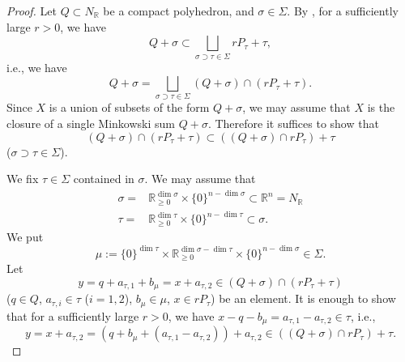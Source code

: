 \documentclass[10pt,a4paper]{amsart}
\def\R{\mathbb{R}}
\begin{document}
   \begin{proof}
     Let $Q \subset N_\R$ be a 
     compact polyhedron, 
        and  $\sigma \in \Sigma$.
    By , 
    for a sufficiently large $r >0$, 
     we have  
     $$ Q + \sigma \subset 
      \bigsqcup_{\sigma \supset \tau \in \Sigma }  rP_{\tau} + \tau, $$
    i.e., we have 
     $$ Q + \sigma = 
      \bigsqcup_{\sigma \supset \tau \in \Sigma } 
      (Q + \sigma) \cap ( rP_{\tau} + \tau). $$
      Since $X$ is a union of subsets of the form $Q + \sigma$, 
    we may assume that 
     $X$ is the closure of 
     a single Minkowski sum $ Q + \sigma $.
     Therefore 
    it suffices to show that 
      $$(Q + \sigma) \cap ( rP_{\tau} + \tau) \subset  
      ( (Q + \sigma) \cap  rP_{\tau} ) + \tau $$
    ($ \sigma \supset \tau \in \Sigma$).

     We fix $ \tau \in \Sigma$ contained in $\sigma$.
     We may assume that 
     \begin{align*}
     \sigma = &  \R_{\geq 0}^{\dim \sigma} \times \{ 0 \}^{n-\dim \sigma}  \subset \R^n = N_\R  \\
     \tau = & \R_{\geq 0}^{\dim \tau} \times \{  0\}^{n-\dim \tau} \subset \sigma .
     \end{align*}
    We put 
    $$\mu := \{ 0 \}^{\dim \tau } \times \R_{\geq 0}^{\dim \sigma - \dim \tau } \times \{ 0 \}^{n-\dim \sigma} \in \Sigma.$$
     Let 
     $$y =q+a_{\tau,1} + b_\mu
         = x + a_{\tau,2} \in (Q + \sigma) \cap ( rP_{\tau} + \tau) $$
     ($q \in Q$, $a_{\tau,i} \in \tau$ ($i =1,2$), $b_\mu \in \mu$, $x \in rP_\tau$) be an element. 
     It is enough to show 
      that for a sufficiently large $r >0$, 
      we have  $x-q-b_\mu = a_{\tau,1}-a_{\tau,2} \in \tau$, i.e., 
      $$y= x +a_{\tau,2} = 
      (q+b_{\mu}+ (a_{\tau,1}-a_{\tau,2}) )+a_{\tau,2} \in ( (Q + \sigma) \cap  rP_{\tau} ) + \tau 
      .$$
      


\end{proof}
\end{document}

